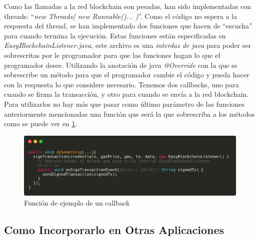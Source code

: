 Como las llamadas a la red blockchain son pesadas, han sido implementadas con threads: ``\textit{new Threads( new Runnable(){...} )}''. Como el código no espera a la respuesta del thread, se han implementado dos funciones que hacen de ``escucha'' para cuando termina la ejecución. Estas funciones están especificadas en \emph{EasyBlockchainListener.java}, este archivo es una \emph{interdaz de java} para poder ser sobrescritas por le programador para que las funciones hagan lo que el programador desee. Utilizando la anotación de java \textit{@Override} con la que se sobrescribe un método para que el programador cambie el código y pueda hacer con la respuesta lo que considere necesario. Tenemos dos callbacks, uno para cuando se firma la transacción, y otro para cuando se envía a la red blockchain. Para utilizarlos no hay más que pasar como último parámetro de las funciones anteriormente mencionadas una función que será la que sobrescriba a los métodos como se puede ver en \ref{fig:callback}.


\begin{figure}[h!]
  \centering
  \includegraphics[width=0.8\linewidth]{figs/Desarrollo/SDK/callback}
  \caption[Función de ejemplo de un callback]{Función de ejemplo de un callback}
  \label{fig:callback}
\end{figure}

\subsection{Como Incorporarlo en Otras Aplicaciones} \label{sec:Maven}

